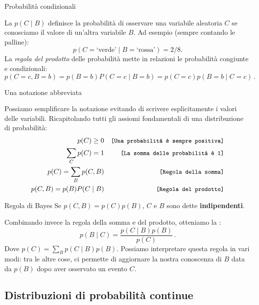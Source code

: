 \documentclass[12pt,aspectratio=169]{beamer}
\begin{document}
\begin{frame}{Probabilità condizionali}
	
	La  $p(C \mid B)$ definisce la probabilità di osservare una variabile aleatoria $C$ se conosciamo il valore di un'altra variabile $B$. Ad esempio (sempre contando le palline):
	$$
	p(C = \text{`verde'} \mid B = \text{`rossa'}) = 2 / 8.
	$$
	La \textit{regola del prodotto} delle probabilità mette in relazioni le probabilità congiunte e condizionali:
	$$
	p(C=c, B=b) = p(B=b)P(C=c\mid B=b) = p(C=c)p(B=b \mid C=c) \,.
	$$

\end{frame}

\begin{frame}{Una notazione abbreviata}
	
	Possiamo semplificare la notazione evitando di scrivere esplicitamente i valori delle variabili. Ricapitolando tutti gli assiomi fondamentali di una distribuzione di probabilità:
	\begin{align*}
		p(C) \ge 0 & & \texttt{\small [Una probabilità è sempre positiva]} \\
		\sum_C p(C) = 1 & & \texttt{\small [La somma delle probabilità è 1]} \\
		p(C) = \sum_{B} p(C, B) & & \texttt{\small [Regola della somma]} \\
		p(C, B) = p(B)P(C\mid B) & & \texttt{\small [Regola del prodotto]}
	\end{align*}

\end{frame}

\begin{frame}{Regola di Bayes}
	Se $p(C,B) = p(C)p(B)$, $C$ e $B$ sono dette \textbf{indipendenti}. 
	
	Combinando invece la regola della somma e del prodotto, otteniamo la :
	$$
	p(B \mid C) = \frac{p(C \mid B)p(B)}{p(C)} \,.
	$$
	Dove $p(C)=\sum_B p(C \mid B)p(B)$. Possiamo interpretare questa regola in vari modi: tra le altre cose, ci permette di aggiornare la nostra conoscenza di $B$ data da $p(B)$ dopo aver osservato un evento $C$.
	
\end{frame}

\subsection{Distribuzioni di probabilità continue}
\end{document}
